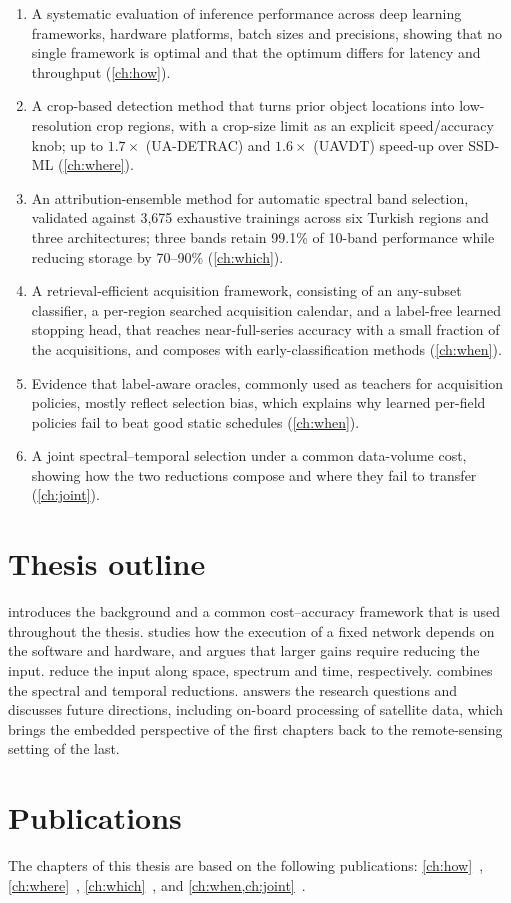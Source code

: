 \begin{enumerate}
  \item A systematic evaluation of inference performance across deep learning
  frameworks, hardware platforms, batch sizes and precisions, showing that no
  single framework is optimal and that the optimum differs for latency and
  throughput (\cref{ch:how}).
  \item A crop-based detection method that turns prior object locations into
  low-resolution crop regions, with a crop-size limit as an explicit
  speed/accuracy knob; up to $1.7\times$ (UA-DETRAC) and $1.6\times$ (UAVDT)
  speed-up over SSD-ML (\cref{ch:where}).
  \item An attribution-ensemble method for automatic spectral band selection,
  validated against 3{,}675 exhaustive trainings across six Turkish regions
  and three architectures; three bands retain 99.1\% of 10-band performance
  while reducing storage by 70--90\% (\cref{ch:which}).
  \item A retrieval-efficient acquisition framework, consisting of an any-subset
  classifier, a per-region searched acquisition calendar, and a label-free
  learned stopping head, that reaches near-full-series accuracy with a small
  fraction of the acquisitions, and composes with early-classification methods
  (\cref{ch:when}).
  \item Evidence that label-aware oracles, commonly used as teachers for
  acquisition policies, mostly reflect selection bias, which explains why
  learned per-field policies fail to beat good static schedules
  (\cref{ch:when}).
  \item A joint spectral--temporal selection under a common data-volume cost,
  showing how the two reductions compose and where they fail to transfer
  (\cref{ch:joint}).
\end{enumerate}

\section{Thesis outline}
\label{sec:intro:outline}

 introduces the background and a common cost--accuracy
framework that is used throughout the thesis.  studies how the
execution of a fixed network depends on the software and hardware, and argues
that larger gains require reducing the input. 
reduce the input along space, spectrum and time, respectively.
 combines the spectral and temporal reductions. 
answers the research questions and discusses future directions, including
on-board processing of satellite data, which brings the embedded perspective of
the first chapters back to the remote-sensing setting of the last.

\section{Publications}
\label{sec:intro:pubs}
The chapters of this thesis are based on the following publications:
\cref{ch:how}~\cite{ulker2020reviewing}, \cref{ch:where}~\cite{ulker2022accelerating},
\cref{ch:which}~\cite{ulker2026bandselection}, and
\cref{ch:when,ch:joint}~\cite{ulker2027acquisitions}.

